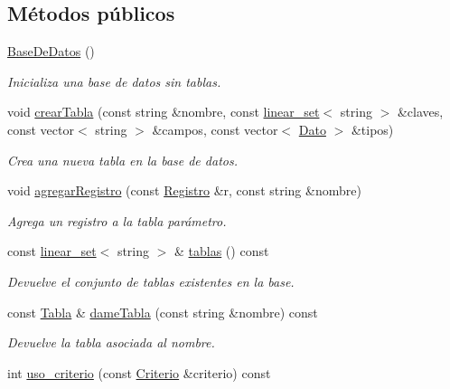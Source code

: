 \subsection*{Métodos públicos}
\begin{DoxyCompactItemize}
\item 
\hyperlink{classBaseDeDatos_a85a4992b2d9d7ed072efa792384495b5}{Base\-De\-Datos} ()
\begin{DoxyCompactList}\small\item\em Inicializa una base de datos sin tablas. \end{DoxyCompactList}\item 
void \hyperlink{classBaseDeDatos_aee0685f94a16b05b2893b24349716292}{crear\-Tabla} (const string \&nombre, const \hyperlink{classlinear__set}{linear\-\_\-set}$<$ string $>$ \&claves, const vector$<$ string $>$ \&campos, const vector$<$ \hyperlink{classDato}{Dato} $>$ \&tipos)
\begin{DoxyCompactList}\small\item\em Crea una nueva tabla en la base de datos. \end{DoxyCompactList}\item 
void \hyperlink{classBaseDeDatos_ada69808e7d6f26e34bab5b67ab4f5d05}{agregar\-Registro} (const \hyperlink{classRegistro}{Registro} \&r, const string \&nombre)
\begin{DoxyCompactList}\small\item\em Agrega un registro a la tabla parámetro. \end{DoxyCompactList}\item 
const \hyperlink{classlinear__set}{linear\-\_\-set}$<$ string $>$ \& \hyperlink{classBaseDeDatos_a24cb80244dbd9d34227f0d808aaeffa8}{tablas} () const 
\begin{DoxyCompactList}\small\item\em Devuelve el conjunto de tablas existentes en la base. \end{DoxyCompactList}\item 
const \hyperlink{classTabla}{Tabla} \& \hyperlink{classBaseDeDatos_ac83ffb074091a70f4879a85db830d603}{dame\-Tabla} (const string \&nombre) const 
\begin{DoxyCompactList}\small\item\em Devuelve la tabla asociada al nombre. \end{DoxyCompactList}\item 
int \hyperlink{classBaseDeDatos_a0b2094c4f3e59e38e5771b8d81da9077}{uso\-\_\-criterio} (const \hyperlink{classBaseDeDatos_a6742a222e87623bc92a810a693fb337b}{Criterio} \&criterio) const 

\end{DoxyCompactItemize}
